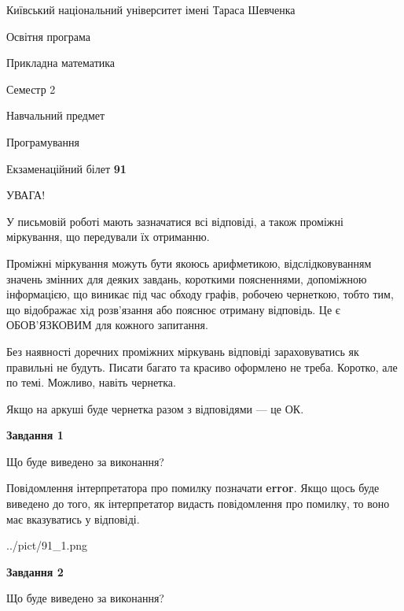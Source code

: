 \documentclass[12pt, ukrainian]{article}
\begin{document}
{{\begin {small}\par
{ \center  Київський національний університет імені Тараса Шевченка \par}
{\parbox {5 cm}{Освітня програма \hfill}{\parbox {7 cm}{Прикладна математика \hfill}}\parbox {6 cm}{\hfill Семестр 2}}\par
{\parbox {5 cm} {Навчальний предмет \hfill}\parbox {7 cm}{Програмування \hfill}\parbox {6cm}{\hfill}\par}\vspace{-7pt} \end{small}}{\center Екзаменаційний білет \No \textbf
{ 91 }\par}}
{
\begin {large}
УВАГА!

У письмовій роботі мають зазначатися всі відповіді, а також проміжні міркування, що передували їх отриманню.

Проміжні міркування можуть бути якоюсь арифметикою, відслідковуванням зна\-чень змінних для деяких завдань,
короткими поясненнями, допоміжною інформацією, що виникає під час обходу графів, робочею чернеткою,
тобто тим, що відображає хід розв’язання або пояснює отриману відповідь.
Це є ОБОВ’ЯЗКОВИМ для кожного запитання.

Без наявності доречних проміжних міркувань відповіді зараховуватись як правиль\-ні не будуть.
Писати багато та красиво оформлено не треба. Коротко, але по темі. Можли\-во, навіть чернетка.

Якщо на аркуші буде чернетка разом з відповідями --- це ОК.

\newpage

{\begin {center}\textbf{Завдання 1}\end {center}}\par
Що буде виведено за виконання?

Повідомлення інтерпретатора про помилку позначати \textbf{error}.
Якщо щось буде виведено до того, як інтерпретатор видасть повідомлення про помилку, 
то воно має вказуватись у відповіді. \par


\begin{center}
	{../pict/91_1.png}
\end{center}
\newpage

{\begin {center}\textbf{Завдання 2}\end {center}}\par
Що буде виведено за виконання?


\end{large}}
\end{document}
